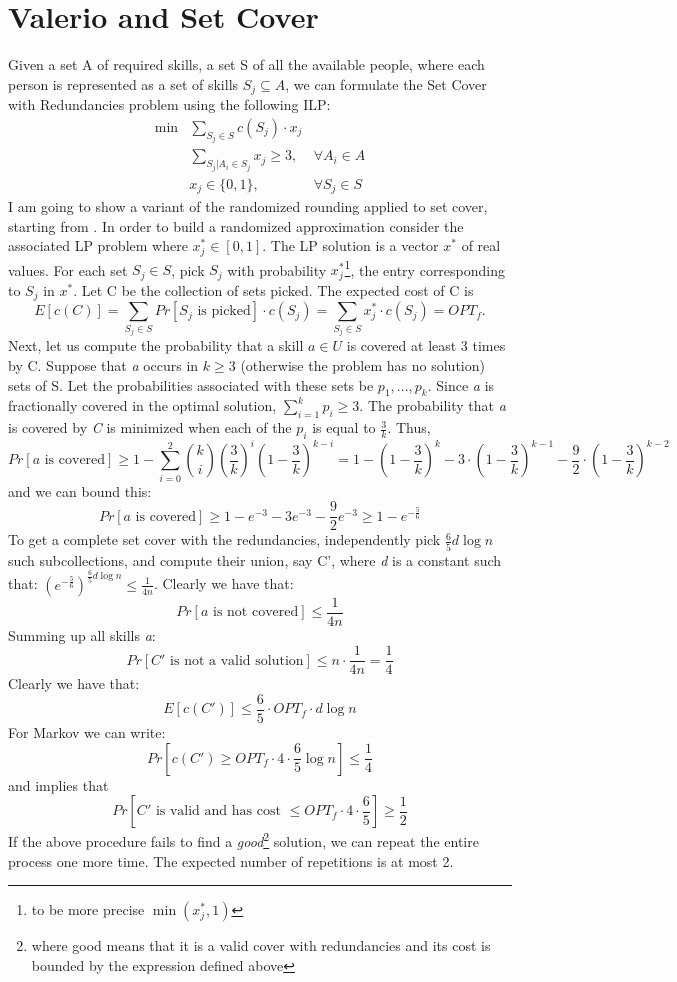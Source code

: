 \section{Valerio and Set Cover}
Given a set A of required skills, a set S of all the available people, where each person is represented as a set of skills $S_j \subseteq A$, we can formulate the Set Cover with Redundancies problem using the following ILP:
\begin{align*}
\min&\sum_{S_j \in S} c(S_j) \cdot x_j \\
&\sum_{S_j | A_i \in S_j} x_j \geq 3, & \forall A_i \in A \\
&x_j \in \{0, 1\}, & \forall S_j \in S
\end{align*}
I am going to show a variant of the randomized rounding applied to set cover, starting from \cite{Vazirani}.
In order to build a randomized approximation consider the associated LP problem where $x^*_j \in [0, 1]$. The LP solution is a vector $x^*$ of real values.
For each set $S_j \in S$, pick $S_j$ with probability $x^*_j$\footnote{to be more precise $\min(x^*_j, 1)$}, the entry corresponding to $S_j$ in $x^*$. Let C be the collection of sets picked. The expected cost of C is
\[
E[c(C)] = \sum_{S_j \in S} Pr[S_j \text{ is picked}] \cdot c(S_j) = \sum_{S_j \in S} x^*_j \cdot c(S_j) = OPT_f.
\]
Next, let us compute the probability that a skill $a \in U$ is covered at least 3 times by C. Suppose that \textit{a} occurs in $k \geq 3$ (otherwise the problem has no solution) sets of S. Let the probabilities associated with these sets be $p_1, ..., p_k.$ Since \textit{a} is fractionally covered in the optimal solution, $\sum_{i=1}^{k} p_i \geq 3.$ The probability that \textit{a} is covered by \textit{C} is minimized when each of the $p_i$ is equal to $\frac{3}{k}.$ Thus,
\[
Pr[a \text{ is covered}] \geq  1 - \sum_{i=0}^{2} \binom{k}{i} (\frac{3}{k})^{i} (1-\frac{3}{k})^{k-i} = 1 - (1-\frac{3}{k})^k - 3 \cdot (1-\frac{3}{k})^{k-1} - \frac{9}{2}\cdot (1-\frac{3}{k})^{k-2}
\]
and we can bound this:
\[
Pr[a \text{ is covered}] \geq 1 - e^{-3} - 3e^{-3} - \frac{9}{2} e^{-3} \geq 1- e^{-\frac{5}{6}}
\]
To get a complete set cover with the redundancies, independently pick $\frac{6}{5}d \log n$ such subcollections, and compute their union, say C', where \textit{d} is a constant such that:
$({e^{-\frac{5}{6}}})^{\frac{6}{5} d\log n} \leq \frac{1}{4n}$. Clearly we have that:
\[
Pr[a \text{ is not covered}] \leq \frac{1}{4n}
\]
Summing up all skills \textit{a}:
\[
Pr[C' \text{ is not a valid solution}] \leq n \cdot \frac{1}{4n} = \frac{1}{4}
\]
Clearly we have that:
\[
E[c(C')] \leq \frac{6}{5} \cdot OPT_f \cdot d \log n
\]
For Markov we can write:
\[
Pr[c(C') \geq OPT_f \cdot 4\cdot \frac{6}{5} \log n] \leq \frac{1}{4}
\]
and implies that
\[
Pr[C' \text{ is valid and has cost } \leq OPT_f \cdot 4\cdot \frac{6}{5}] \geq \frac{1}{2}
\]
If the above procedure fails to find a \textit{good}\footnote{where good means that it is a valid cover with redundancies and its cost is bounded by the expression defined above} solution, we can repeat the entire process one more time. The expected number of repetitions is at most 2.